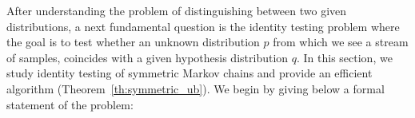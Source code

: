 After understanding the problem of distinguishing between two given distributions, a next fundamental question is the identity testing problem where the goal is to test whether an unknown distribution $p$ from which we see a stream of samples, coincides with a given hypothesis distribution $q$. 
In this section, we study identity testing of symmetric Markov chains and provide an efficient algorithm (Theorem~\ref{th:symmetric_ub}).  
We begin by giving below a formal statement of the problem:\\


\begin{algorithm}[H]
	\label{def:mc-id-testing}
\end{algorithm}



